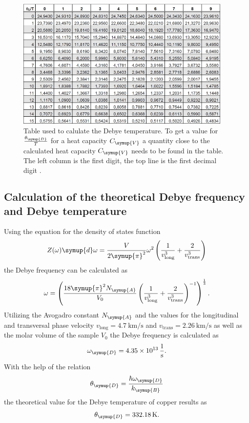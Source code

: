\begin{figure}
  \centering
  \includegraphics[width = 0.95\textwidth]{content/pics/debyetemp.png}
  \caption{Table used to calulate the Debye temperature. To get a value for $\frac{\theta_{\symup{D}}}{T}$ for a heat capacity $C_{\symup{V}}$ a quantity close %
  to the calculated heat capacity $C_{\symup{V}}$ needs to be found in the table. The left column is the first digit, the top line is the first decimal digit \cite{V47}.} 
  \label{fig:debyetemp}
\end{figure}

\subsection{Calculation of the theoretical Debye frequency and Debye temperature}
\label{subsec:Calculation of the theoretical Debye frequency and Debye temperature}
Using the equation for the density of states function
\begin{equation*}
  Z(\omega)\symup{d}\omega = \frac{V}{2\symup{\pi}^2}\omega^2\left(\frac{1}{v^3_{\text{long}}}+\frac{2}{v^3_{\text{trans}}}\right)
\end{equation*}
the Debye frequency can be calculated as
\begin{equation*}
  \omega = \left(\frac{18\symup{\pi}^2N_{\symup{A}}}{V_0}\left(\frac{1}{v^3_{\text{long}}}+\frac{2}{v^3_{\text{trans}}}\right)^{-1}\right)^{\frac{1}{3}}.
\end{equation*}
Utilizing the Avogadro constant $N_{\symup{A}}$ and the values for the longitudinal and transversal phase velocity 
$v_{\text{long}} = \qty{4.7}{\kilo\metre\per\second}$ and $v_{\text{trans}}=\qty{2.26}{\kilo\metre\per\second}$ as well as the molar volume of the sample $V_0$ the Debye frequency is calculated as
\begin{equation*}
  \omega_{\symup{D}} = \qty{4.35e13}{\per\second}.
\end{equation*}
With the help of the relation
\begin{equation*}
  \theta_{\symup{D}} = \frac{\hbar\omega_{\symup{D}}}{k_{\symup{B}}}
\end{equation*}
the theoretical value for the Debye temperature of copper results as
\begin{equation*}
  \theta_{\symup{D}} = \qty{332.18}{\kelvin}.
\end{equation*}